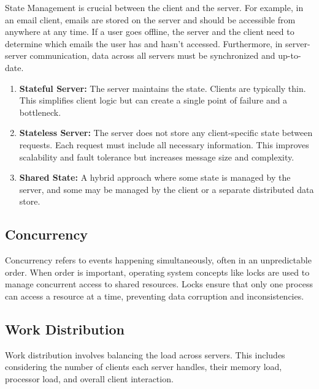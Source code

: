 State Management is crucial between the client and the server. For example, in an email client, emails are stored on the server and should be accessible from anywhere at any time. If a user goes offline, the server and the client need to determine which emails the user has and hasn't accessed.  Furthermore, in server-server communication, data across all servers must be synchronized and up-to-date.

\begin{enumerate}[itemsep=1pt]
    \item \textbf{Stateful Server:} The server maintains the state.  Clients are typically thin.  This simplifies client logic but can create a single point of failure and a bottleneck.
    \item \textbf{Stateless Server:} The server does not store any client-specific state between requests. Each request must include all necessary information. This improves scalability and fault tolerance but increases message size and complexity.
    \item \textbf{Shared State:}  A hybrid approach where some state is managed by the server, and some may be managed by the client or a separate distributed data store.
\end{enumerate}

\subsection{Concurrency}
Concurrency refers to events happening simultaneously, often in an unpredictable order. When order is important, operating system concepts like locks are used to manage concurrent access to shared resources. Locks ensure that only one process can access a resource at a time, preventing data corruption and inconsistencies.

\subsection{Work Distribution}
Work distribution involves balancing the load across servers. This includes considering the number of clients each server handles, their memory load, processor load, and overall client interaction.

